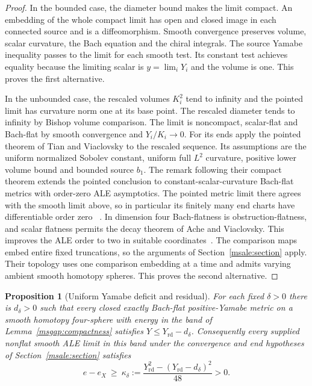 \documentclass[11pt]{article}
\numberwithin{equation}{section}
\newtheorem{proposition}[theorem]{Proposition}
\theoremstyle{definition}
\theoremstyle{remark}
\newcommand{\rd}{\mathrm{rd}}
\begin{document}
\begin{proof}
In the bounded case, the diameter bound makes the limit compact.
An embedding of the whole compact limit has open and closed image
in each connected source and is a diffeomorphism.
Smooth convergence preserves volume, scalar curvature, the Bach
equation and the chiral integrals. The source Yamabe inequality
passes to the limit for each smooth test. Its constant test
achieves equality because the limiting scalar is \(y=\lim_i Y_i\)
and the volume is one. This proves the first alternative.

In the unbounded case, the rescaled volumes \(K_i^2\) tend to
infinity and the pointed limit has curvature norm one at its
base point. The rescaled diameter tends to infinity by Bishop
volume comparison. The limit is noncompact, scalar-flat and
Bach-flat by smooth convergence and \(Y_i/K_i\to0\).
For its ends apply the pointed theorem of Tian and Viaclovsky
to the rescaled sequence. Its assumptions are the uniform
normalized Sobolev constant, uniform full \(L^2\) curvature,
positive lower volume bound and bounded source \(b_1\).
The remark following their compact theorem extends the pointed
conclusion to constant-scalar-curvature Bach-flat metrics with
order-zero ALE asymptotics. The pointed metric limit there
agrees with the smooth limit above, so in particular its
finitely many end charts have differentiable order zero
~\cite[Theorems 1.1--1.3 and \S7]{TianViaclovsky2004Moduli}.
In dimension four Bach-flatness is obstruction-flatness,
and scalar flatness permits the decay theorem of Ache and
Viaclovsky. This improves the ALE order to two in suitable
coordinates~\cite[Definition 1.1 and Theorem 1.2]{AcheViaclovsky2011Obstruction}.
The comparison maps embed entire fixed truncations, so the
arguments of Section~\ref{msale:section} apply. Their topology
uses one comparison embedding at a time and admits varying
ambient smooth homotopy spheres. This proves the second alternative.
\end{proof}

\begin{proposition}[Uniform Yamabe deficit and residual]\label{msgap:yamabe}
For each fixed \(\delta>0\) there is \(d_\delta>0\) such that every
closed exactly Bach-flat positive-Yamabe metric on a smooth
homotopy four-sphere with energy in the band of
Lemma~\ref{msgap:compactness} satisfies \(Y\le Y_{\rd}-d_\delta\).
Consequently every supplied nonflat smooth ALE limit in this band
under the convergence and end hypotheses of Section~\ref{msale:section}
satisfies
\begin{equation}\label{msgap:uniform-residual}
 e-e_X\ \ge\ \kappa_\delta
       :=\frac{Y_{\rd}^2-(Y_{\rd}-d_\delta)^2}{48}>0 .
\end{equation}
\end{proposition}
\end{document}
